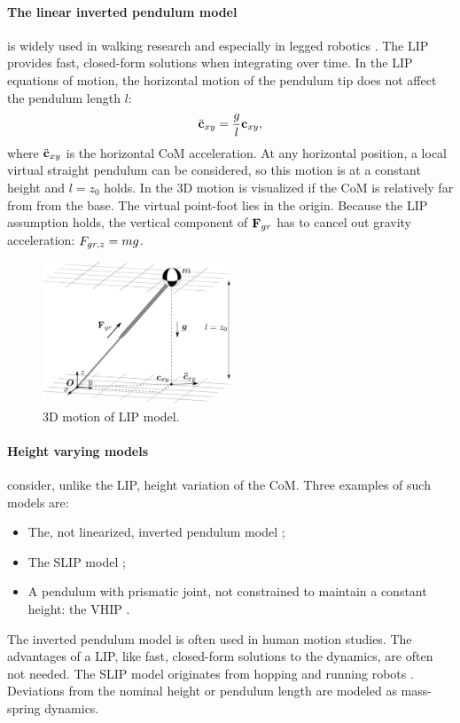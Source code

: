 \paragraph{The linear inverted pendulum model} is widely used in walking research and especially in legged robotics \cite{kajita20013d}. The \ac{LIP} provides fast, closed-form solutions when integrating over time. In the \ac{LIP} equations of motion, the horizontal motion of the pendulum tip does not affect the pendulum length $l$:
\begin{equation}
\ddot{\mathbf{c}}_{xy}=\frac{g}{l}\mathbf{c}_{xy},
\label{eq:LIPeom}
\end{equation}
where $\ddot{\mathbf{c}}_{xy}$ is the horizontal \ac{CoM} acceleration. At any horizontal position, a local virtual straight pendulum can be considered, so this motion is at a constant height and $l=z_0$  holds. In  the \ac{3D} motion is visualized if the \ac{CoM} is relatively far from from the base. The virtual point-foot lies in the origin. Because the \ac{LIP} assumption holds, the vertical component of $\mathbf{F}_{gr}$ has to cancel out gravity acceleration: $F_{gr,z}=mg$.\\
\begin{figure}
\centering
\includegraphics[width=0.5\textwidth]{STYLESTUFF/3DCoMwithoutfoot.png}
\caption{\ac{3D} motion of \ac{LIP} model.}
\label{fig:3dlip}
\end{figure}

\paragraph{Height varying models} consider, unlike the \ac{LIP}, height variation of the \ac{CoM}. Three examples of such models are:
\begin{itemize}
	\item The, not linearized, inverted pendulum model \cite{kuo2005energetic};
	\item The \ac{SLIP} model \cite{liu2015trajectory};
	\item A pendulum with prismatic joint, not constrained to maintain a constant height: the \ac{VHIP} \cite{pratt2007derivation}.
\end{itemize}
The inverted pendulum model is often used in human motion studies. The advantages of a \ac{LIP}, like fast, closed-form solutions to the dynamics, are often not needed. The \ac{SLIP} model originates from hopping and running robots \cite{schwind1998spring}. Deviations from the nominal height or pendulum length are modeled as mass-spring dynamics. 

